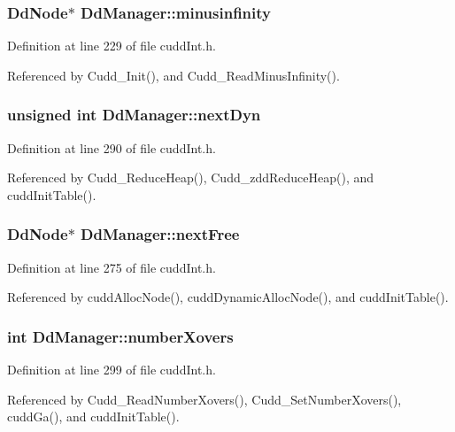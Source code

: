 \subsubsection{\setlength{\rightskip}{0pt plus 5cm}\bf{Dd\-Node}$\ast$ \bf{Dd\-Manager::minusinfinity}}\label{structDdManager_801d4f3177fdf9c8cc956c2cc71039d3}




Definition at line 229 of file cudd\-Int.h.

Referenced by Cudd\_\-Init(), and Cudd\_\-Read\-Minus\-Infinity().
\subsubsection{\setlength{\rightskip}{0pt plus 5cm}unsigned int \bf{Dd\-Manager::next\-Dyn}}\label{structDdManager_832f5099477ac37dbce551565c61496d}




Definition at line 290 of file cudd\-Int.h.

Referenced by Cudd\_\-Reduce\-Heap(), Cudd\_\-zdd\-Reduce\-Heap(), and cudd\-Init\-Table().
\subsubsection{\setlength{\rightskip}{0pt plus 5cm}\bf{Dd\-Node}$\ast$ \bf{Dd\-Manager::next\-Free}}\label{structDdManager_01395a8c5e505bddc9ba02de6780fbff}




Definition at line 275 of file cudd\-Int.h.

Referenced by cudd\-Alloc\-Node(), cudd\-Dynamic\-Alloc\-Node(), and cudd\-Init\-Table().
\subsubsection{\setlength{\rightskip}{0pt plus 5cm}int \bf{Dd\-Manager::number\-Xovers}}\label{structDdManager_e07777ec66d6f9d4bd8145be68af71d4}




Definition at line 299 of file cudd\-Int.h.

Referenced by Cudd\_\-Read\-Number\-Xovers(), Cudd\_\-Set\-Number\-Xovers(), cudd\-Ga(), and cudd\-Init\-Table().

